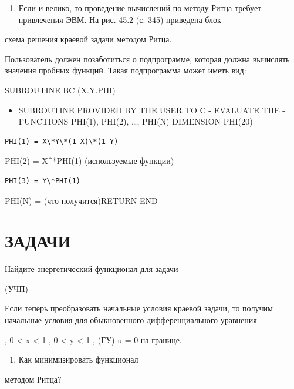 \documentclass[
  ukrainian,
]{article}
\providecommand{\tightlist}{%
  \setlength{\itemsep}{0pt}\setlength{\parskip}{0pt}}
\begin{document}
\begin{enumerate}
\def\labelenumi{\arabic{enumi}.}
\setcounter{enumi}{4}
\tightlist
\item
  Если и велико, то проведение вычислений по методу Ритца требует
  привлечения ЭВМ. На рис. 45.2 (с. 345) приведена блок-
\end{enumerate}

схема решения краевой задачи методом Ритца.

Пользователь должен позаботиться о подпрограмме, которая должна
вычислять значения пробных функций. Такая подпрограмма может иметь вид:

SUBROUTINE BC (X.Y.PHI)

\begin{itemize}
\tightlist
\item
  SUBROUTINE PROVIDED BY THE USER TO C - EVALUATE THE - FUNCTIONS
  PHI(1), PHI(2), \ldots, PHI(N) DIMENSION PHI(20)
\end{itemize}

\begin{verbatim}
PHI(1) = X\*Y\*(1-X)\*(1-Y)
\end{verbatim}

PHI(2) = X\^{}*PHI(1) (используемые функции)

\begin{verbatim}
PHI(3) = Y\*PHI(1)
\end{verbatim}

PHI(N) = (что получится)RETURN END

\section{\texorpdfstring{\textbf{ЗА}ДАЧИ}{ЗАДАЧИ}}\label{ux437ux430ux434ux430ux447ux438}

Найдите энергетический функционал для задачи

(УЧП)

Если теперь преобразовать начальные условия краевой задачи, то получим
начальные условия для обыкновенного дифференциального уравнения

, 0 \textless{} x \textless{} 1 , 0 \textless{} y \textless{} 1 , (ГУ) u
= 0 на границе.

\begin{enumerate}
\def\labelenumi{\arabic{enumi}.}
\setcounter{enumi}{1}
\tightlist
\item
  Как минимизировать функционал
\end{enumerate}

методом Ритца?
\end{document}
